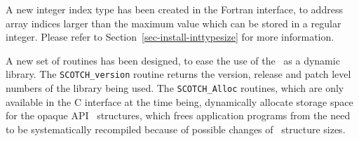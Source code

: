 A new integer index type has been created in the Fortran interface, to
address array indices larger than the maximum value which can be
stored in a regular integer. Please refer to
Section~\ref{sec-install-inttypesize} for more information.

A new set of routines has been designed, to ease the use of the
\libscotch\ as a dynamic library. The \texttt{SCOTCH\_\lbt version}
routine returns the version, release and patch level numbers of the
library being used. The \texttt{SCOTCH\_\lbt *Alloc} routines,
which are only available in the C interface at the time being,
dynamically allocate storage space for the opaque API
\scotch\ structures, which frees application programs from the need
to be systematically recompiled because of possible changes of
\scotch\ structure sizes.
